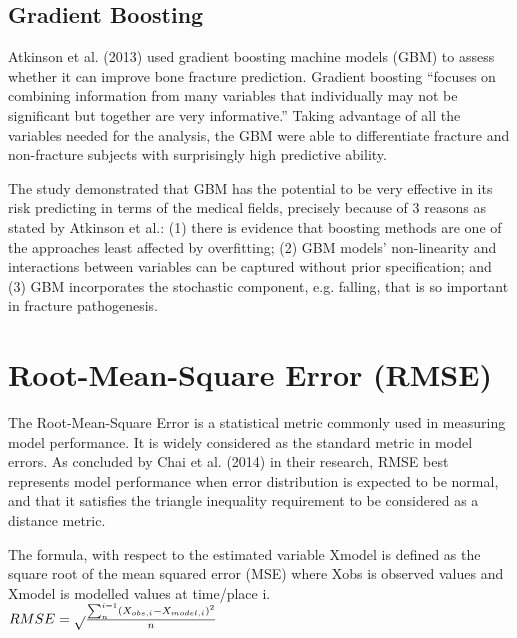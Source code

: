 \documentclass[10pt,11pt,12pt,oneside]{book}
\begin{document}
        \subsection{Gradient Boosting}
        Atkinson et al. (2013) used gradient boosting machine models (GBM) to assess whether it can improve bone fracture prediction. Gradient boosting “focuses on combining information from many variables that individually may not be significant but together are very informative.” Taking advantage of all the variables needed for the analysis, the GBM were able to differentiate fracture and non-fracture subjects with surprisingly high predictive ability.

        The study demonstrated that GBM has the potential to be very effective in its risk predicting in terms of the medical fields, precisely because of 3 reasons as stated by Atkinson et al.: (1) there is evidence that boosting methods are one of the approaches least affected by overfitting; (2) GBM models’ non-linearity and interactions between variables can be captured without prior specification; and (3) GBM incorporates the stochastic component, e.g. falling, that is so important in fracture pathogenesis. \cite{Atkinson2012}
    \section{Root-Mean-Square Error (RMSE)}
    The Root-Mean-Square Error is a statistical metric commonly used in measuring model performance. It is widely considered as the standard metric in model errors. As concluded by Chai et al. (2014) in their research, RMSE best represents model performance when error distribution is expected to be normal, and that it satisfies the triangle inequality requirement to be considered as a distance metric.
    
The formula, with respect to the estimated variable Xmodel is defined as the square root of the mean squared error (MSE) where Xobs is observed values and Xmodel is modelled values at time/place i.\\
    \begingroup
\Large
    \begin{math}
\centering
RMSE = \sqrt{}\frac{\sum_{n}^{i=1}\left ( X_{obs,i} - X_{model,i}\right )^{2}}{n}
\end{math}\\
\endgroup
\end{document}

